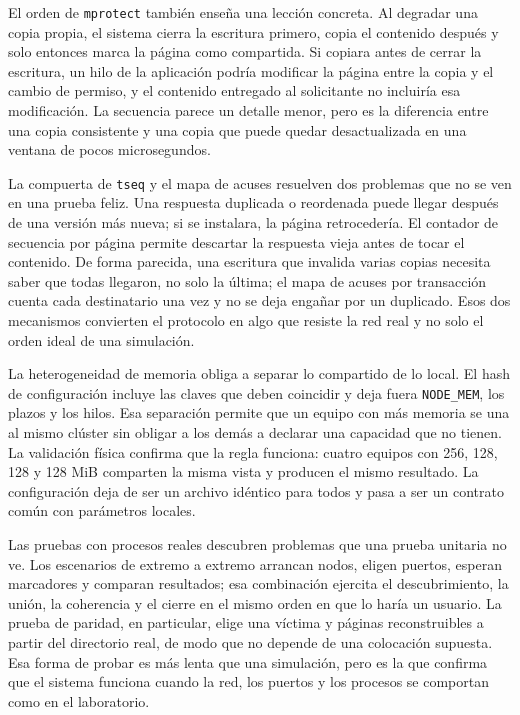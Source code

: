 El orden de \texttt{mprotect} también enseña una lección concreta. Al degradar una copia propia, el sistema cierra la escritura primero, copia el contenido después y solo entonces marca la página como compartida. Si copiara antes de cerrar la escritura, un hilo de la aplicación podría modificar la página entre la copia y el cambio de permiso, y el contenido entregado al solicitante no incluiría esa modificación. La secuencia parece un detalle menor, pero es la diferencia entre una copia consistente y una copia que puede quedar desactualizada en una ventana de pocos microsegundos.

La compuerta de \texttt{tseq} y el mapa de acuses resuelven dos problemas que no se ven en una prueba feliz. Una respuesta duplicada o reordenada puede llegar después de una versión más nueva; si se instalara, la página retrocedería. El contador de secuencia por página permite descartar la respuesta vieja antes de tocar el contenido. De forma parecida, una escritura que invalida varias copias necesita saber que todas llegaron, no solo la última; el mapa de acuses por transacción cuenta cada destinatario una vez y no se deja engañar por un duplicado. Esos dos mecanismos convierten el protocolo en algo que resiste la red real y no solo el orden ideal de una simulación.

La heterogeneidad de memoria obliga a separar lo compartido de lo local. El hash de configuración incluye las claves que deben coincidir y deja fuera \texttt{NODE\_MEM}, los plazos y los hilos. Esa separación permite que un equipo con más memoria se una al mismo clúster sin obligar a los demás a declarar una capacidad que no tienen. La validación física confirma que la regla funciona: cuatro equipos con 256, 128, 128 y 128 MiB comparten la misma vista y producen el mismo resultado. La configuración deja de ser un archivo idéntico para todos y pasa a ser un contrato común con parámetros locales.

Las pruebas con procesos reales descubren problemas que una prueba unitaria no ve. Los escenarios de extremo a extremo arrancan nodos, eligen puertos, esperan marcadores y comparan resultados; esa combinación ejercita el descubrimiento, la unión, la coherencia y el cierre en el mismo orden en que lo haría un usuario. La prueba de paridad, en particular, elige una víctima y páginas reconstruibles a partir del directorio real, de modo que no depende de una colocación supuesta. Esa forma de probar es más lenta que una simulación, pero es la que confirma que el sistema funciona cuando la red, los puertos y los procesos se comportan como en el laboratorio.

